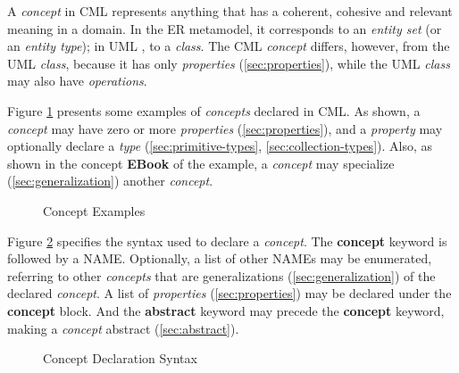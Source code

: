 \begin{definition}
A \emph{concept} in CML represents anything
that has a coherent, cohesive and relevant meaning in a domain.
In the ER \cite{er} metamodel,
it corresponds to an \emph{entity set} (or an \emph{entity type});
in UML \cite{uml},
to a \emph{class}.
The CML \emph{concept} differs, however, from the UML \emph{class},
because it has only \emph{properties} (\ref{sec:properties}),
while the UML \emph{class} may also have \emph{operations}.
\end{definition}

\begin{examples}
Figure \ref{fig:ex:concepts} presents some examples of \emph{concepts} declared in CML.
As shown,
a \emph{concept} may have zero or more \emph{properties}
(\ref{sec:properties}),
and a \emph{property} may optionally declare a \emph{type}
(\ref{sec:primitive-types}, \ref{sec:collection-types}).
Also, as shown in the concept \textbf{EBook} of the example,
a \emph{concept} may specialize
(\ref{sec:generalization})
another \emph{concept}.
\end{examples}

\begin{figure}
\verbatimfont{\small}

\caption{Concept Examples}
\label{fig:ex:concepts}
\end{figure}

\begin{concrete-syntax}
Figure \ref{fig:stx:concept} specifies the syntax used
to declare a \emph{concept}.
The \textbf{concept} keyword is followed by a NAME.
Optionally, a list of other NAMEs may be enumerated,
referring to other \emph{concepts}
that are generalizations (\ref{sec:generalization}) of the declared \emph{concept}.
A list of \emph{properties} (\ref{sec:properties}) may be declared under the \textbf{concept} block.
And the \textbf{abstract} keyword may precede the \textbf{concept} keyword, making a \emph{concept} abstract (\ref{sec:abstract}).
\end{concrete-syntax}

\begin{figure}
\verbatimfont{\small}

\caption{Concept Declaration Syntax}
\label{fig:stx:concept}
\end{figure}

